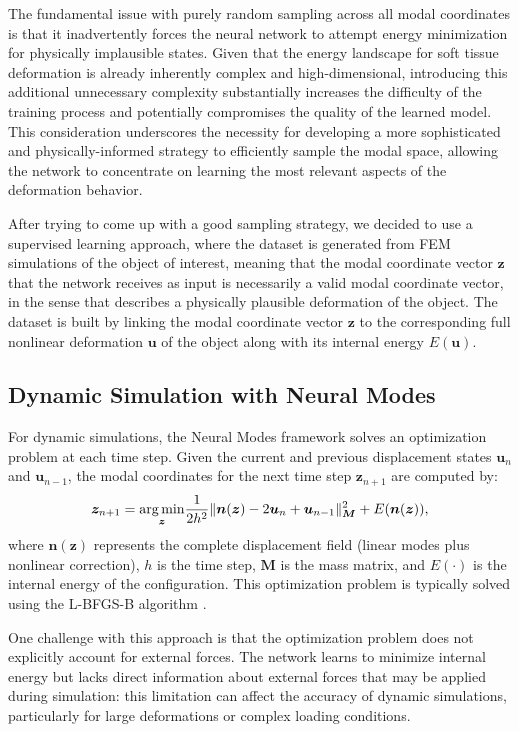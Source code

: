 The fundamental issue with purely random sampling across all modal coordinates is that it inadvertently forces the neural network to attempt energy minimization for physically implausible states. Given that the energy landscape for soft tissue deformation is already inherently complex and high-dimensional, introducing this additional unnecessary complexity substantially increases the difficulty of the training process and potentially compromises the quality of the learned model. This consideration underscores the necessity for developing a more sophisticated and physically-informed strategy to efficiently sample the modal space, allowing the network to concentrate on learning the most relevant aspects of the deformation behavior.

After trying to come up with a good sampling strategy, we decided to use a supervised learning approach, where the dataset is generated from FEM simulations of the object of interest, meaning that the modal coordinate vector \( \bm{z} \) that the network receives as input is necessarily a valid modal coordinate vector, in the sense that describes a physically plausible deformation of the object. The dataset is built by linking the modal coordinate vector \( \bm{z} \) to the corresponding full nonlinear deformation \( \bm{u} \) of the object along with its internal energy \( E(\bm{u}) \). 

\subsection{Dynamic Simulation with Neural Modes}
\label{sec:subspace_dynamics}
For dynamic simulations, the Neural Modes framework solves an optimization problem at each time step. Given the current and previous displacement states $\bm{u}_n$ and $\bm{u}_{n-1}$, the modal coordinates for the next time step $\bm{z}_{n+1}$ are computed by:
\begin{equation}
    \bm{z}_{n+1} = \underset{\bm{z}}{\operatorname*{arg\,min}} \frac{1}{2h^2} \|\bm{n}(\bm{z}) - 2\bm{u}_n + \bm{u}_{n-1}\|_{\bm{M}}^2 + E(\bm{n}(\bm{z})),
    \label{eq:optimization_problem}
\end{equation}
where $\bm{n}(\bm{z})$ represents the complete displacement field (linear modes plus nonlinear correction), $h$ is the time step, $\bm{M}$ is the mass matrix, and $E(\cdot)$ is the internal energy of the configuration. This optimization problem is typically solved using the L-BFGS-B algorithm \cite{Liu_1989}.

One challenge with this approach is that the optimization problem does not explicitly account for external forces. The network learns to minimize internal energy but lacks direct information about external forces that may be applied during simulation: this limitation can affect the accuracy of dynamic simulations, particularly for large deformations or complex loading conditions.



